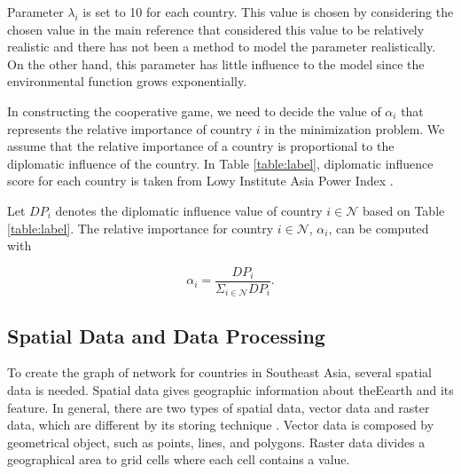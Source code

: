 \documentclass[a4paper,fleqn]{cas-dc}
\begin{document}
Parameter $\lambda_i$ is set to 10 for each country. This value is chosen by considering the chosen value in the main reference that considered this value to be relatively realistic and there has not been a method to model the parameter realistically. On the other hand, this parameter has little influence to the model since the environmental function grows exponentially.

In constructing the cooperative game, we need to decide the value of $\alpha_i$ that represents the relative importance of country $i$ in the minimization problem. We assume that the relative importance of a country is proportional to the diplomatic influence of the country. In Table \ref{table:label}, diplomatic influence score for each country is taken from Lowy Institute Asia Power Index \citep{InstituteLowy}.

Let $DP_i$ denotes the diplomatic influence value of country $i\in\mathcal{N}$ based on Table \ref{table:label}. The relative importance for country $i\in\mathcal{N}$, $\alpha_i$, can be computed with

\begin{equation} \label{equation:diplomatic influence weight}
    \alpha_i = \dfrac{DP_i}{\Sigma_{i\in\mathcal{N}}DP_i}.
\end{equation}

\subsection{Spatial Data and Data Processing} \label{subsection:spatial data}

To create the graph of network for countries in Southeast Asia, several spatial data is needed. Spatial data gives geographic information about theEearth and its feature. In general, there are two types of spatial data, vector data and raster data, which are different by its storing technique \citep{JANIPELLA2019143}. Vector data is composed by geometrical object, such as points, lines, and polygons. Raster data divides a geographical area to grid cells where each cell contains a value.
\end{document}
